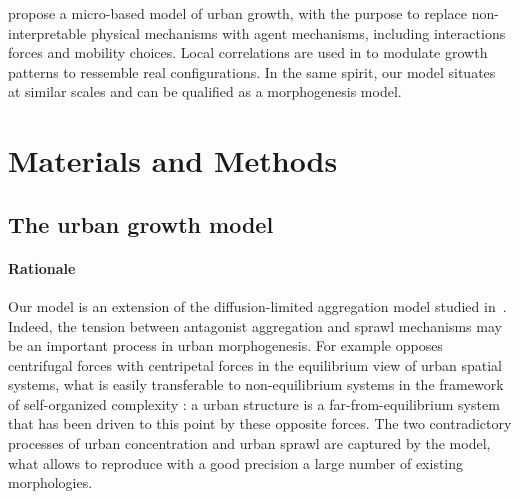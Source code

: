 \documentclass[10pt,letterpaper]{article}
\begin{document}
\cite{andersson2002urban} propose a micro-based model of urban growth, with the purpose to replace non-interpretable physical mechanisms with agent mechanisms, including interactions forces and mobility choices. Local correlations are used in \cite{makse1998modeling} to modulate growth patterns to ressemble real configurations. In the same spirit, our model situates at similar scales and can be qualified as a morphogenesis model. %








\section*{Materials and Methods}

\subsection*{The urban growth model}




\paragraph{Rationale}






Our model is an extension of the diffusion-limited aggregation model studied in~\cite{batty2006hierarchy}. Indeed, the tension between antagonist aggregation and sprawl mechanisms may be an important process in urban morphogenesis. For example \cite{fujita1996economics} opposes centrifugal forces with centripetal forces in the equilibrium view of urban spatial systems, what is easily transferable to non-equilibrium systems in the framework of self-organized complexity : a urban structure is a far-from-equilibrium system that has been driven to this point by these opposite forces. The two contradictory processes of urban concentration and urban sprawl are captured by the model, what allows to reproduce with a good precision a large number of existing morphologies.
\end{document}
